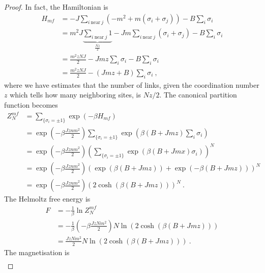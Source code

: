    \begin{proof}
        In fact, the Hamiltonian is 
        \begin{equation*}
        \begin{aligned}
            H_{mf} & = - J \sum_{i~\text{near}~j}  (- m^2 + m(\sigma_i + \sigma_j)) - B \sum_i \sigma_i \\ & = m^2 J \underbrace{\sum_{i~\text{near}~j} 1}_{\frac{Nz}{2}} - J m \sum_{i~\text{near}~j}  (\sigma_i + \sigma_j) - B \sum_i \sigma_i \\ & = \frac{m^2 z N J}{2} - Jmz \sum_i \sigma_i - B \sum_i \sigma_i \\ & = \frac{m^2 z N J}{2} - (J m z + B) \sum_i \sigma_i ~,
        \end{aligned}
        \end{equation*}
        where we have estimates that the number of links, given the coordination number $z$ which tells how many neighboring sites, is $Nz/2$.
        The canonical partition function becomes
        \begin{equation*}
        \begin{aligned}
            Z_N^{mf} & = \sum_{\{\sigma_i = \pm 1\}} \exp(- \beta H_{mf}) \\ & = \exp(- \beta \frac{J z n m^2}{2}) \sum_{\{\sigma_i = \pm 1\}} \exp(\beta (B + Jmz) \sum_i \sigma_i) \\ & = \exp(- \beta \frac{J z n m^2}{2}) (\sum_{\{\sigma_i = \pm 1\}} \exp(\beta (B + Jmx) \sigma_i))^N \\ & = \exp(- \beta \frac{J z n m^2}{2}) (\exp(\beta(B + Jmz)) + \exp(- \beta (B + Jmz)))^N \\ & = \exp(- \beta \frac{J z n m^2}{2}) (2 \cosh (\beta (B + Jmz)))^N ~.
        \end{aligned}
        \end{equation*}
        The Helmoltz free energy is 
        \begin{equation*}
        \begin{aligned}
            F & = - \frac{1}{\beta} \ln Z_N^{mf} \\ & = - \frac{1}{\beta} (- \beta \frac{J z N m^2}{2}) N \ln (2 \cosh (\beta (B + Jmz))) \\ & = \frac{J z N m^2}{2} N \ln (2 \cosh (\beta (B + Jmz))) ~.
        \end{aligned}
        \end{equation*}
        The magnetisation is 
        \begin{equation*}
        \begin{aligned}

\end{aligned}
\end{equation*}
\end{proof}
